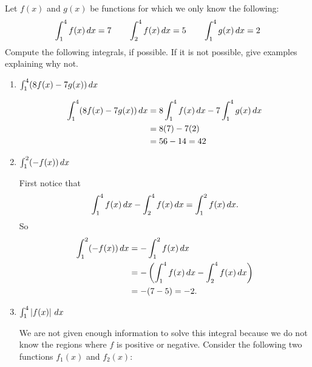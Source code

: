 \documentclass[ nooutcomes]{ximera}
\begin{document}
\begin{problem}
Let $f(x)$ and $g(x)$ be functions for which we only know the following:
$$ \int_1^4 f(x)\,d x = 7	\qquad	\int_2^4 f(x)\,d x = 5	\qquad	\int_1^4 g(x)\,d x = 2 $$
Compute the following integrals, if possible.  If it is not possible, give examples explaining why not.
	\begin{enumerate}
	
	\item  $\int_1^4 (8f(x) - 7g(x))\,d x $
		\begin{freeResponse}
			\begin{align*}
			\int_1^4 (8f(x) - 7g(x))\,d x &= 8 \int_1^4 f(x) \,d x - 7 \int_1^4 g(x) \,d x  \\
			&= 8(7) - 7(2) \\
			&= 56 - 14 = 42
			\end{align*}
		\end{freeResponse}
		
		
		
	\item  $\int_1^2 (-f(x)) \,d x $
		\begin{freeResponse}
		First notice that
			\begin{equation*}
			\int_1^4 f(x) \,d x - \int_2^4 f(x) \,d x = \int_1^2 f(x) \,d x.
			\end{equation*}
		So
			\begin{align*}
			\int_1^2 (-f(x)) \,d x &= - \int_1^2 f(x) \,d x  \\
			&= - \left( \int_1^4 f(x)\,d x - \int_2^4 f(x)\,d x \right)  \\
			&= - (7 - 5) = -2.
			\end{align*}
			
		\end{freeResponse}
		
		
		
	\item  $\int_1^4 \left| f(x) \right| \,d x$
		\begin{freeResponse}
		We are not given enough information to solve this integral because we do not know the regions where $f$ is positive or negative.
		Consider the following two functions $f_1(x)$ and $f_2(x)$:  
		

\end{freeResponse}
\end{enumerate}
\end{problem}
\end{document}
